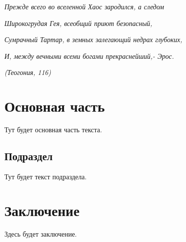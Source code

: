     \textit{Прежде всего во вселенной Хаос зародился, а следом }
    \par \textit{Широкогрудая Гея, всеобщий приют безопасный,} 
    \par \textit{Сумрачный Тартар, в земных залегающий недрах глубоких, }
    \par \textit{И, между вечными всеми богами прекраснейший,- Эрос. }
    \par \textit{ (Теогония, 116)}
     
    
	\section{Основная часть}
	Тут будет основная часть текста.
	\clearpage
	\subsection{Подраздел}
	Тут будет текст подраздела.
	\clearpage
	\section{Заключение}
	Здесь будет заключение.
	
